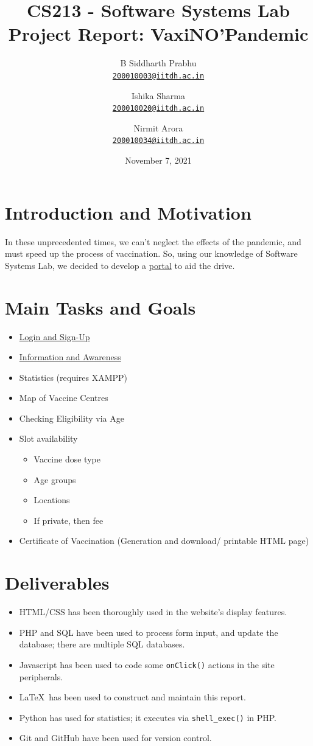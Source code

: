 \documentclass{article}
\title{\textbf{
CS213 - Software Systems Lab \\ 
Project Report: VaxiNO'Pandemic
}}
\author{
  B Siddharth Prabhu\\
  \href{mailto:200010003@iitdh.ac.in}{\texttt{200010003@iitdh.ac.in}}
  \and
  Ishika Sharma\\
  \href{mailto:200010020@iitdh.ac.in}{\texttt{200010020@iitdh.ac.in}}
  \and
  Nirmit Arora\\
  \href{mailto:200010034@iitdh.ac.in}{\texttt{200010034@iitdh.ac.in}}
}
\date{November 7, 2021}
\begin{document}
\maketitle

\section{Introduction and Motivation}
In these unprecedented times, we can't neglect the effects of the pandemic, and must speed up the process of vaccination. So, using our knowledge of Software Systems Lab, we decided to develop a {\color{blue}\href{https://whitelisted2.github.io/VaxiNO-Pandemic/}{portal}} to aid the drive.

\section{Main Tasks and Goals}
\begin{itemize}
    \item {\color{blue}\href{https://whitelisted2.github.io/VaxiNO-Pandemic/user_login_signup.html}{Login and Sign-Up}}
    \item {\color{blue}\href{https://whitelisted2.github.io/VaxiNO-Pandemic/awareness.html}{Information and Awareness}}
    \item Statistics (requires XAMPP) %
    \item Map of Vaccine Centres
    \item Checking Eligibility via Age
    \item Slot availability %
    \begin{itemize}
        \item Vaccine dose type
        \item Age groups
        \item Locations
        \item If private, then fee
    \end{itemize}
    \item Certificate of Vaccination (Generation and download/ printable HTML page)
\end{itemize}
\section{Deliverables}
\begin{itemize}
    \item HTML/CSS has been thoroughly used in the website's display features.
    \item PHP and SQL have been used to process form input, and update the database; there are multiple SQL databases.
    \item Javascript has been used to code some \texttt{onClick()} actions in the site peripherals.
    \item \LaTeX~has been used to construct and maintain this report.
    \item Python has used for statistics; it executes via \texttt{shell\_exec()} in PHP.
    \item Git and GitHub have been used for version control.
\end{itemize}
\end{document}
